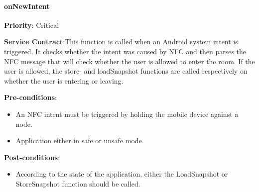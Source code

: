     \paragraph{onNewIntent}
			\begin{description}
			    \item{\textbf{Priority}:} Critical%
			    \item{\textbf{Service Contract}:}This function is called when an Android system intent is triggered. It checks whether the intent was caused by NFC and then parses the NFC message that will check whether the user is allowed to enter the room. If the user is allowed, the store- and loadSnapshot functions are called respectively on whether the user is entering or leaving.%
			    \item{\textbf{Pre-conditions}:}%
    			    \begin{itemize}
    			        \item An NFC intent must be triggered by holding the mobile device against a node.
    			        \item Application either in safe or unsafe mode.
      			    \end{itemize}
			    \item{\textbf{Post-conditions}:} %
    			    \begin{itemize}
    		        \item According to the state of the application, either the LoadSnapshot or StoreSnapshot function should be called.
    			    
    			    \end{itemize}
			\end{description}
	

